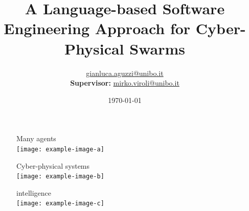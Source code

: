 \documentclass[presentation, 9pt, aspectratio=169]{beamer}\mode<presentation>{\usetheme{AMSBolognaFC}}
\title[A Soft-Eng Approach for CPSWs!]
{A Language-based Software Engineering Approach for Cyber-Physical Swarms}
\author[\sspeaker{G.Aguzzi}]
{\speaker{Gianluca Aguzzi} \href{mailto:gianluca.aguzzi@unibo.it}{gianluca.aguzzi@unibo.it} \\
\textbf{Supervisor:} \speaker{Mirko Viroli} \href{mailto:mirko.viroli@unibo.it}{mirko.viroli@unibo.it}}
\institute[DISI, Univ.\ Bologna]
{%
\textsc{Alma Mater Studiorum} -- Universit{\`a} di Bologna \\[0.1cm]
\textbf{Final Year PhD Report}\\[0.15cm]
}
\date[\today]{\today}
\begin{document}

\frame{\titlepage}

\section*{\refname}

\begin{frame}
\centering
{}
\begin{multicols}{3}
	\begin{figure}
		\large{Many  agents}\\[0.1cm]
		\texttt{[image: example-image-a]}
	\end{figure}
	\begin{figure}
		\large{Cyber-physical systems}\\[0.1cm]
		\texttt{[image: example-image-b]}
	\end{figure}
	\begin{figure}
		\large{ intelligence}\\[0.1cm]
		\texttt{[image: example-image-c]}
	\end{figure}
\end{multicols}
\end{frame}
\end{document}
